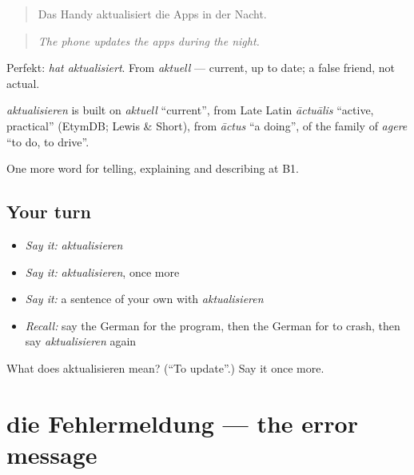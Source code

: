 \begin{quote}
Das Handy aktualisiert die Apps in der Nacht.
\end{quote}

\begin{quote}
\emph{The phone updates the apps during the night.}
\end{quote}

Perfekt: \emph{hat aktualisiert}. From \emph{aktuell} — current, up to date; a false friend, not actual.

\begin{cousinweb}
\emph{aktualisieren} is built on \emph{aktuell} \textquotedblleft{}current\textquotedblright{}, from Late Latin \emph{āctuālis} \textquotedblleft{}active, practical\textquotedblright{} (EtymDB; Lewis \& Short), from \emph{āctus} \textquotedblleft{}a doing\textquotedblright{}, of the family of \emph{agere} \textquotedblleft{}to do, to drive\textquotedblright{}.
\end{cousinweb}

\begin{grammarlens}[title={What you've built}]
One more word for telling, explaining and describing at B1.
\end{grammarlens}

\subsection*{Your turn}
\begin{itemize}
\raggedright
  \item \emph{Say it:} \emph{aktualisieren}
  \item \emph{Say it:} \emph{aktualisieren}, once more
  \item \emph{Say it:} a sentence of your own with \emph{aktualisieren}
  \item \emph{Recall:} say the German for the program, then the German for to crash, then say \emph{aktualisieren} again
\end{itemize}

\begin{tcolorbox}[breakable,colback=teal!4,colframe=teal!35!black,title={Before you move on}]
What does aktualisieren mean? (\textquotedblleft{}To update\textquotedblright{}.) Say it once more.
\end{tcolorbox}
\section[die Fehlermeldung]{die Fehlermeldung — the error message}

